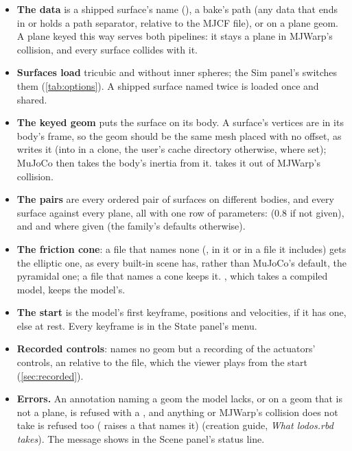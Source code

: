 \begin{itemize}
\item \textbf{The data} is a shipped surface's name (), a bake's path (any data that ends in  or holds a path separator, relative to the MJCF file), or  on a plane geom. A plane keyed this way serves both pipelines: it stays a plane in MJWarp's collision, and every surface collides with it.
\item \textbf{Surfaces load} tricubic and without inner spheres; the Sim panel's  switches them (\cref{tab:options}). A shipped surface named twice is loaded once and shared.
\item \textbf{The keyed geom} puts the surface on its body. A surface's vertices are in its body's frame, so the geom should be the same mesh placed with no offset, as  writes it (into  in a clone, the user's cache directory otherwise,  where set); MuJoCo then takes the body's inertia from it.  takes it out of MJWarp's collision.
\item \textbf{The pairs} are every ordered pair of surfaces on different bodies, and every surface against every plane, all with one row of parameters:  (0.8 if not given), and  and  where given (the family's defaults otherwise).
\item \textbf{The friction cone}: a file that names none (, in it or in a file it includes) gets the elliptic one, as every built-in scene has, rather than MuJoCo's default, the pyramidal one; a file that names a cone keeps it. , which takes a compiled model, keeps the model's.
\item \textbf{The start} is the model's first keyframe, positions and velocities, if it has one, else  at rest. Every keyframe is in the State panel's menu.
\item \textbf{Recorded controls}:  names no geom but a recording of the actuators' controls, an  relative to the file, which the viewer plays from the start (\cref{sec:recorded}).
\item \textbf{Errors.} An annotation naming a geom the model lacks, or  on a geom that is not a plane, is refused with a , and anything  or MJWarp's collision does not take is refused too ( raises a  that names it) (creation guide, \emph{What lodos.rbd takes}). The message shows in the Scene panel's status line.
\end{itemize}

